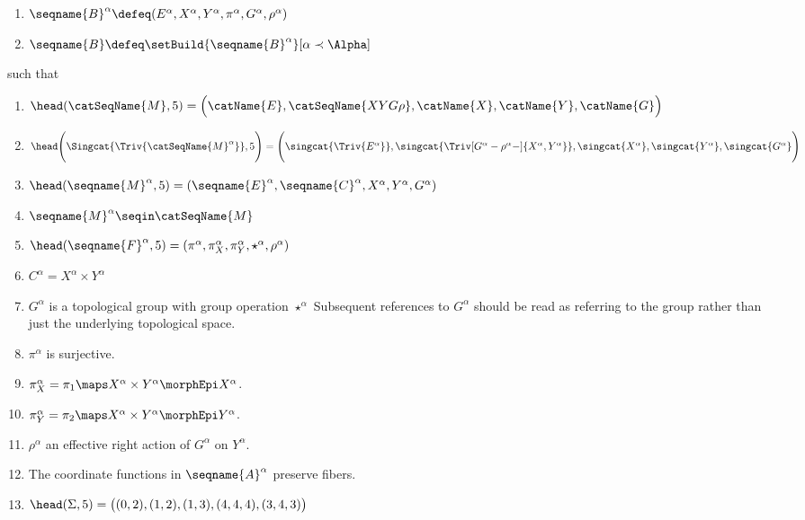 \documentclass{article}
\begin{document}
\begin{theorem}
\begin{enumerate}
\item
$
  \seqname{B}^\alpha \defeq
  (
    E^\alpha,
    X^\alpha,
    Y^\alpha,
    \pi^\alpha,
    G^\alpha,
    \rho^\alpha
  )
$

\item
$\seqname{B} \defeq \setBuild{{ \seqname{B}^\alpha}}[\alpha \prec \Alpha]$
\end{enumerate}
such that
\begin{enumerate}[resume]
\item
$
  \head(\catSeqName{M},5) =
  \Bigl  (
    \catName{E},
    \catSeqName{XYG\rho},
    \catName{X},
    \catName{Y},
    \catName{G}
  \Bigr  )
$
\item
$
  \head \Biggl ( \Singcat{\Triv{\catSeqName{M}^\alpha}},5 \Biggr ) =
  \Biggl  (
    \singcat{\Triv{E^\alpha}},
    \singcat{\Triv[G^\alpha-\rho^\alpha-]{X^\alpha,Y^\alpha}},
    \singcat{X^\alpha},
    \singcat{Y^\alpha},
    \singcat{G^\alpha}
  \Biggr  )
$
\item
$
  \head(\seqname{M}^\alpha,5) =
  (
    \seqname{E}^\alpha,
    \seqname{C}^\alpha,
    X^\alpha,
    Y^\alpha,
    G^\alpha
  )
$
\item $\seqname{M}^\alpha \seqin \catSeqName{M}$
\item
$
  \head(\seqname{F}^\alpha,5) =
  (
    \pi^\alpha,
    \pi^\alpha_X,
    \pi^\alpha_Y,
    \star^\alpha,
    \rho^\alpha
  )
$

\item $C^\alpha = X^\alpha \times Y^\alpha$
\item $G^\alpha$ is a topological group with group operation $\star^\alpha$
Subsequent references to $G^\alpha$ should be read as referring to
the group rather than just the underlying topological space.
\item $\pi^\alpha$ is surjective.
\item $\pi^\alpha_X = \pi_1 \maps X^\alpha \times Y^\alpha \morphEpi X^\alpha$.
\item $\pi^\alpha_Y = \pi_2 \maps X^\alpha \times Y^\alpha \morphEpi Y^\alpha$.
\item $\rho^\alpha$ an effective right action of $G^\alpha$ on $Y^\alpha$.
\item The coordinate functions in $\seqname{A}^\alpha$ preserve fibers.
\item
$
  \head(\Sigma,5) =
  \bigl ( (0,2), (1,2), (1,3), (4,4,4), (3,4,3) \bigr )
$
\end{enumerate}


\end{theorem}
\end{document}
